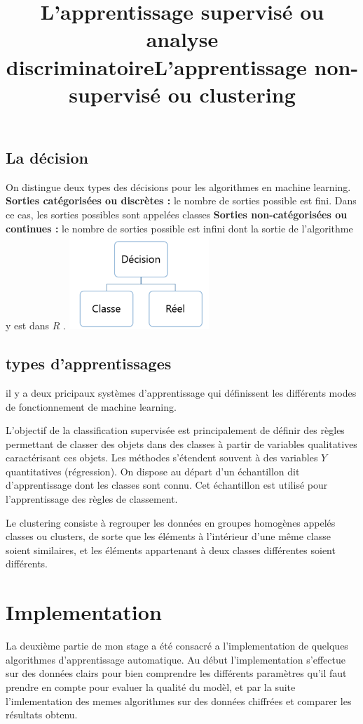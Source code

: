 \documentclass[a4paper,12pt]{report}
\begin{document}
\subsection{La décision} 
On distingue deux types des décisions pour les algorithmes en machine learning. \newline
\textbf{Sorties catégorisées ou discrètes :} le nombre de sorties possible est fini. Dans ce cas, les sorties possibles sont appelées classes\newline
\textbf{Sorties non-catégorisées ou continues :} le nombre de sorties possible est infini dont la sortie de l'algorithme y est dans $R$ .\newline
\hspace*{5cm}{}\includegraphics[scale=1]{classifictation_vs_regression.png}
\subsection{types d'apprentissages}
il y a deux pricipaux systèmes d'apprentissage qui définissent les différents modes de fonctionnement de machine learning.\newline
\title{\textbf{L’apprentissage supervisé ou analyse discriminatoire}}\newline
L'objectif de la classification supervisée est principalement de définir des règles permettant de classer des objets dans des classes
à partir de variables qualitatives caractérisant ces objets. Les méthodes s'étendent souvent à des variables $Y$ quantitatives (régression).
On dispose au départ d'un échantillon dit d'apprentissage dont les classes sont connu. Cet échantillon est utilisé pour l'apprentissage des règles de classement.\newline 
\title{\textbf{L’apprentissage non-supervisé ou clustering}}\newline
Le clustering consiste à regrouper les données en groupes homogènes appelés classes ou clusters, de sorte que les éléments à l’intérieur d’une même classe soient similaires, et les éléments appartenant à deux classes différentes soient différents.
\section{Implementation}
La deuxième partie de mon stage a été consacré a l'implementation de quelques algorithmes d'apprentissage automatique.\newline
Au début l'implementation s'effectue sur des données clairs pour bien comprendre les différents paramètres qu'il faut prendre en compte pour evaluer la qualité du modèl, et par la suite l'imlementation des memes algorithmes sur des données chiffrées et comparer les résultats obtenu. \newline      
\end{document}
